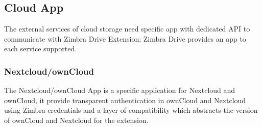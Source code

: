         \subsection{Cloud App}\label{subsec:supportedClouds}
        The external services of cloud storage need specific app with dedicated API to communicate with Zimbra Drive Extension;
        Zimbra Drive provides an app to each service supported.

        \subsubsection{Nextcloud/ownCloud}
        The Nextcloud/ownCloud App is a specific application for Nextcloud and ownCloud, it provide transparent authentication in
        ownCloud and Nextcloud using Zimbra credentials and a layer of compatibility which abstracts the version of
        ownCloud and Nextcloud for the extension.

